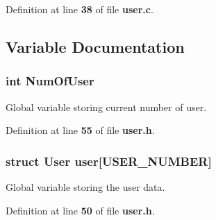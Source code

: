 Definition at line {\bf 38} of file {\bf user.\+c}.



\subsection{Variable Documentation}
\subsubsection[{Num\+Of\+User}]{\setlength{\rightskip}{0pt plus 5cm}int Num\+Of\+User}\label{user_8h_aac90b1eed59a0a4b55ab8735c1561e6a}
Global variable storing current number of user. 

Definition at line {\bf 55} of file {\bf user.\+h}.

\subsubsection[{user}]{\setlength{\rightskip}{0pt plus 5cm}struct {\bf User} user[{\bf U\+S\+E\+R\+\_\+\+N\+U\+M\+B\+E\+R}]}\label{user_8h_ab69c72da1b6bf385854fb5213ae53b36}
Global variable storing the user data. 

Definition at line {\bf 50} of file {\bf user.\+h}.

